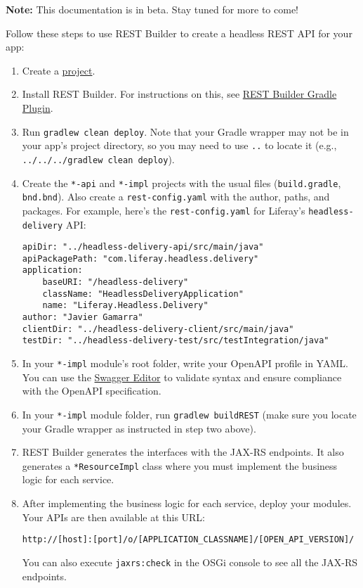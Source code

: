 \noindent\hrulefill

\textbf{Note:} This documentation is in beta. Stay tuned for more to
come!

\noindent\hrulefill

Follow these steps to use REST Builder to create a headless REST API for
your app:

\begin{enumerate}
\def\labelenumi{\arabic{enumi}.}
\item
  Create a
  \href{/docs/7-2/reference/-/knowledge_base/r/creating-a-project}{project}.
\item
  Install REST Builder. For instructions on this, see
  \href{/docs/7-2/reference/-/knowledge_base/r/rest-builder-gradle-plugin}{REST
  Builder Gradle Plugin}.
\item
  Run \texttt{gradlew\ clean\ deploy}. Note that your Gradle wrapper may
  not be in your app's project directory, so you may need to use
  \texttt{..} to locate it (e.g.,
  \texttt{../../../gradlew\ clean\ deploy}).
\item
  Create the \texttt{*-api} and \texttt{*-impl} projects with the usual
  files (\texttt{build.gradle}, \texttt{bnd.bnd}). Also create a
  \texttt{rest-config.yaml} with the author, paths, and packages. For
  example, here's the \texttt{rest-config.yaml} for Liferay's
  \texttt{headless-delivery} API:

\begin{verbatim}
apiDir: "../headless-delivery-api/src/main/java"
apiPackagePath: "com.liferay.headless.delivery"
application:
    baseURI: "/headless-delivery"
    className: "HeadlessDeliveryApplication"
    name: "Liferay.Headless.Delivery"
author: "Javier Gamarra"
clientDir: "../headless-delivery-client/src/main/java"
testDir: "../headless-delivery-test/src/testIntegration/java"
\end{verbatim}
\item
  In your \texttt{*-impl} module's root folder, write your OpenAPI
  profile in YAML. You can use the
  \href{https://editor.swagger.io/}{Swagger Editor} to validate syntax
  and ensure compliance with the OpenAPI specification.
\item
  In your \texttt{*-impl} module folder, run \texttt{gradlew\ buildREST}
  (make sure you locate your Gradle wrapper as instructed in step two
  above).
\item
  REST Builder generates the interfaces with the JAX-RS endpoints. It
  also generates a \texttt{*ResourceImpl} class where you must implement
  the business logic for each service.
\item
  After implementing the business logic for each service, deploy your
  modules. Your APIs are then available at this URL:

\begin{verbatim}
http://[host]:[port]/o/[APPLICATION_CLASSNAME]/[OPEN_API_VERSION]/
\end{verbatim}

  You can also execute \texttt{jaxrs:check} in the OSGi console to see
  all the JAX-RS endpoints.
\end{enumerate}

